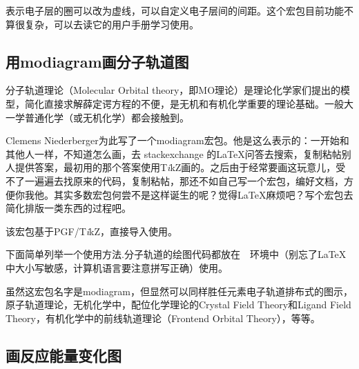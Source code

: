\documentclass[a4paper,UTF8,zihao = -4]{ctexart} %
\providecommand{\tikzlg}{PGF/T\textit{i}kZ}
\newcommand{\tkznm}{T\textit{i}kZ}
\begin{document}
表示电子层的圈可以改为虚线，可以自定义电子层间的间距。这个宏包目前功能不算很复杂，可以去读它的用户手册学习使用。

\subsection{用\textsf{modiagram}画分子轨道图}
\label{sec:modiagram}

分子轨道理论（Molecular Orbital theory，即MO理论）是理论化学家们提出的模型，简化直接求解薛定谔方程的不便，是无机和有机化学重要的理论基础。一般大一学普通化学（或无机化学）都会接触到。

Clemens Niederberger为此写了一个\textsf{modiagram}宏包。他是这么表示的：一开始和其他人一样，不知道怎么画，去 stackexchange 的\LaTeX{}问答去搜索，复制粘帖别人提供答案，最初用的那个答案使用\tkznm{}画的。之后由于经常要画这玩意儿，受不了一遍遍去找原来的代码，复制粘帖，那还不如自己写一个宏包，编好文档，方便你我他。其实多数宏包何尝不是这样诞生的呢？觉得\LaTeX{}麻烦吧？写个宏包去简化排版一类东西的过程吧。

该宏包基于\tikzlg{}，直接导入使用。

\begin{dispListing}
\usepackage{modiagram}  
\end{dispListing}

下面简单列举一个使用方法.分子轨道的绘图代码都放在~~环境中（别忘了\LaTeX{}中大小写敏感，计算机语言要注意拼写正确）使用。

\begin{dispExample}
\begin{MOdiagram}
\EnergyAxis[title = Energy]
\end{MOdiagram}
\end{dispExample}

虽然这宏包名字是\textsf{modiagram}，但显然可以同样胜任元素电子轨道排布式的图示，原子轨道理论，无机化学中，配位化学理论的Crystal Field Theory和Ligand Field Theory，有机化学中的前线轨道理论（Frontend Orbital Theory），等等。

\subsection{画反应能量变化图}
\label{sec:energylevel}
\end{document}
